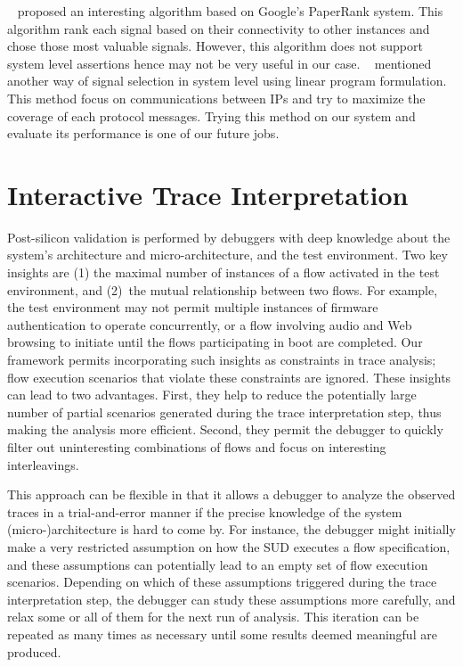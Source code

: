 \documentclass[12pt,frontmatter,copyright,thesis]{usfmanus}
\begin{document}
 ~\cite{forestMa} proposed an interesting algorithm based on Google's PaperRank system. 
 This algorithm rank each signal based on their connectivity to other instances and chose 
 those most valuable signals. However, this algorithm does not support system level assertions
 hence may not be very useful in our case. ~\cite{signalselect} mentioned another way of 
signal selection in system level using linear program formulation. This method focus on communications
 between IPs and try to maximize the coverage of each protocol messages. Trying this method
 on our system and evaluate its performance is one of our future jobs.

\section{Interactive Trace Interpretation}

Post-silicon validation is performed by debuggers with deep
knowledge about the system's architecture and
micro-architecture, and the test environment.  Two key
insights are (1) the maximal number of instances of a flow
activated in the test environment, and (2)~the mutual
relationship between two flows.  For example, the test
environment may not permit multiple instances of firmware
authentication to operate concurrently, or a flow involving
audio and Web browsing to initiate until the flows
participating in boot are completed.  Our framework permits
incorporating such insights as constraints in trace
analysis; flow execution scenarios that violate these
constraints are ignored.  These insights can lead to two
advantages.  First, they help to reduce the potentially
large number of partial scenarios generated during the trace
interpretation step, thus making the analysis more
efficient.  Second, they permit the debugger to quickly
filter out uninteresting combinations of flows and focus on
interesting interleavings.

This approach can be flexible in that it allows a debugger
to analyze the observed traces in a trial-and-error manner
if the precise knowledge of the system (micro-)architecture
is hard to come by.  For instance, the debugger might
initially make a very restricted assumption on how the SUD
executes a flow specification, and these assumptions can
potentially lead to an empty set of flow execution
scenarios.  Depending on which of these assumptions
triggered during the trace interpretation step, the debugger
can study these assumptions more carefully, and relax some
or all of them for the next run of analysis.  This iteration
can be repeated as many times as necessary until some
results deemed meaningful are produced.
\end{document}
